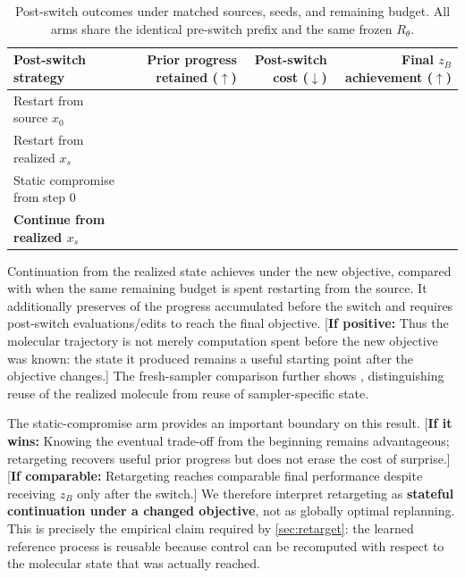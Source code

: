 \begin{table}[t]
\centering
{\small
\begin{tabular}{lrrr}
\toprule
Post-switch strategy & Prior progress retained ($\uparrow$) & Post-switch cost ($\downarrow$) & Final $z_B$ achievement ($\uparrow$) \\
\midrule
Restart from source $x_0$ & \XXX{} & \XXX{} & \XXX{} \\
Restart from realized $x_s$ & \XXX{} & \XXX{} & \XXX{} \\
Static compromise from step 0 & \XXX{} & \XXX{} & \XXX{} \\
\textbf{Continue from realized $x_s$} & \textbf{\XXX{}} & \textbf{\XXX{}} & \textbf{\XXX{}} \\
\bottomrule
\end{tabular}}
\caption{\small Post-switch outcomes under matched sources, seeds, and remaining budget. All arms share the identical pre-switch prefix and the same frozen $R_\theta$.}
\label{tab:retarget}
\end{table}

Continuation from the realized state achieves \textbf{\XXX{}} under the new objective, compared with \textbf{\XXX{}} when the same remaining budget is spent restarting from the source. It additionally preserves \textbf{\XXX{}} of the progress accumulated before the switch and requires \textbf{\XXX{}} post-switch evaluations/edits to reach the final objective. {\color{red}[\textbf{If positive:} Thus the molecular trajectory is not merely computation spent before the new objective was known: the state it produced remains a useful starting point after the objective changes.]} The fresh-sampler comparison further shows \XXX{}, distinguishing reuse of the realized molecule from reuse of sampler-specific state.

The static-compromise arm provides an important boundary on this result. {\color{red}[\textbf{If it wins:} Knowing the eventual trade-off from the beginning remains advantageous; retargeting recovers useful prior progress but does not erase the cost of surprise.] [\textbf{If comparable:} Retargeting reaches comparable final performance despite receiving $z_B$ only after the switch.]} We therefore interpret retargeting as \textbf{stateful continuation under a changed objective}, not as globally optimal replanning. This is precisely the empirical claim required by \cref{sec:retarget}: the learned reference process is reusable because control can be recomputed with respect to the molecular state that was actually reached.
